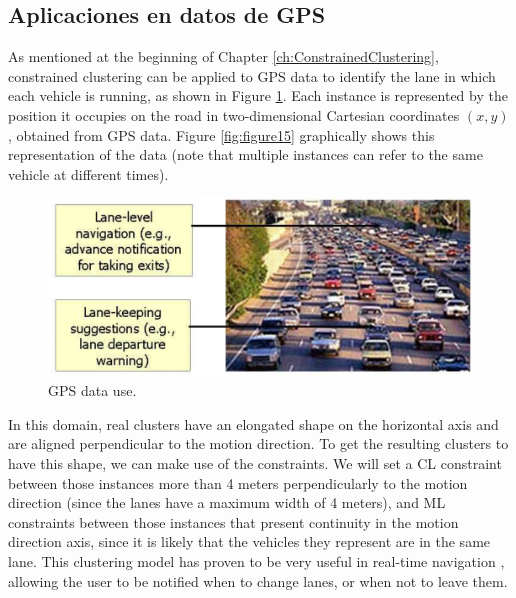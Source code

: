 \subsection{Aplicaciones en datos de GPS} \label{EjemploGPS}

As mentioned at the beginning of Chapter \ref{ch:ConstrainedClustering}, constrained clustering can be applied to \acs{GPS} data to identify the lane in which each vehicle is running, as shown in Figure \ref{fig:GPSClustData}. Each instance is represented by the position it occupies on the road in two-dimensional Cartesian coordinates $(x,y)$, obtained from \acs{GPS} data. Figure \ref{fig:figure15} graphically shows this representation of the data (note that multiple instances can refer to the same vehicle at different times).

\begin{figure}[!h]
	\centering
	\includegraphics[scale=0.3]{gfx/ConstClust/GPS/Coches} 
	\caption[GPS data use.]{GPS data use. \cite{davidson2007survey} \cite{wagstaff2001constrained}}\label{fig:GPSClustData}
\end{figure}


In this domain, real clusters have an elongated shape on the horizontal axis and are aligned perpendicular to the motion direction. To get the resulting clusters to have this shape, we can make use of the constraints. We will set a \acf{CL} constraint between those instances more than 4 meters perpendicularly to the motion direction (since the lanes have a maximum width of 4 meters), and \acf{ML} constraints between those instances that present continuity in the motion direction axis, since it is likely that the vehicles they represent are in the same lane. This clustering model has proven to be very useful in real-time navigation \cite{wagstaff2001constrained}, allowing the user to be notified when to change lanes, or when not to leave them.

